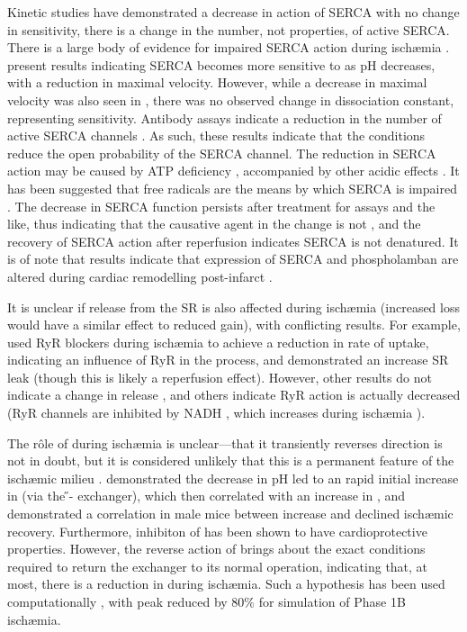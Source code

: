 \documentclass[../thesis-main.tex]{subfiles}
\begin{document}
 Kinetic studies have demonstrated a decrease in action of SERCA with no change in \ca{} sensitivity, \idest{} there is a change in the number, not properties, of active SERCA. There is a large body of evidence for impaired SERCA action during isch\ae{}mia \citep{Dhalla1988, Temsah1999, Lee1967, Toba1978, Kaplan1992}. \citet{Krause1984} present results indicating SERCA becomes more sensitive to \cai{} as pH decreases, with a reduction in maximal velocity. However, while a decrease in maximal velocity was also seen in \citet{Kaplan1992}, there was no observed change in dissociation constant, representing \ca{} sensitivity. Antibody assays indicate a reduction in the number of active SERCA channels \citep{Levitsky1989}. As such, these results indicate that the conditions reduce the open probability of the SERCA channel. The reduction in SERCA action may be caused by ATP deficiency \citep{Camacho1993}, accompanied by other acidic effects \citep{Krause1984}. It has been suggested that free radicals are the means by which SERCA is impaired \citep{Temsah1999, Wang2013, Xu1997, Zweier1988}. The decrease in SERCA function persists after treatment for assays and the like, thus indicating that the causative agent in the change is not \cai{}, and the recovery of SERCA action after reperfusion indicates SERCA is not denatured. It is of note that results indicate that expression of SERCA and phospholamban are altered during cardiac remodelling post-infarct \citep{Sun2005}.
 
 It is unclear if release from the SR is also affected during isch\ae{}mia (increased loss would have a similar effect to reduced gain), with conflicting results. For example, \citet{Feher1989} used RyR blockers during isch\ae{}mia to achieve a reduction in rate of \ca{} uptake, indicating an influence of RyR in the process, and \citet{Fauconnier2011} demonstrated an increase SR leak (though this is likely a reperfusion effect). However, other results do not indicate a change in release \citep{Kaplan1992}, and others indicate RyR action is actually decreased (RyR channels are inhibited by NADH \citep{Wang2013}, which increases during isch\ae{}mia \citep{Esumi1991}).
 
 The r\^ole of \inaca{} during isch\ae{}mia is unclear---that it transiently reverses direction is not in doubt, but it is considered unlikely that this is a permanent feature of the isch\ae{}mic milieu \citep{Rodriguez2006}. \citet{Tani1989} demonstrated the decrease in pH led to an rapid initial increase in \nai{} (via the \H{}-\na{} exchanger), which then correlated with an increase in \cai{}, and \citet{Cross1998} demonstrated a correlation in male mice between increase \inaca{} and declined isch\ae{}mic recovery. Furthermore, inhibiton of \inaca{} has been shown to have cardioprotective properties. However, the reverse action of \inaca{} brings about the exact conditions required to return the exchanger to its normal operation, indicating that, at most, there is a reduction in \inaca{} during isch\ae{}mia. Such a hypothesis has been used computationally \citep{Pollard2002}, with peak \inaca{} reduced by $80\%$ for simulation of Phase 1B isch\ae{}mia.
 
\end{document}
